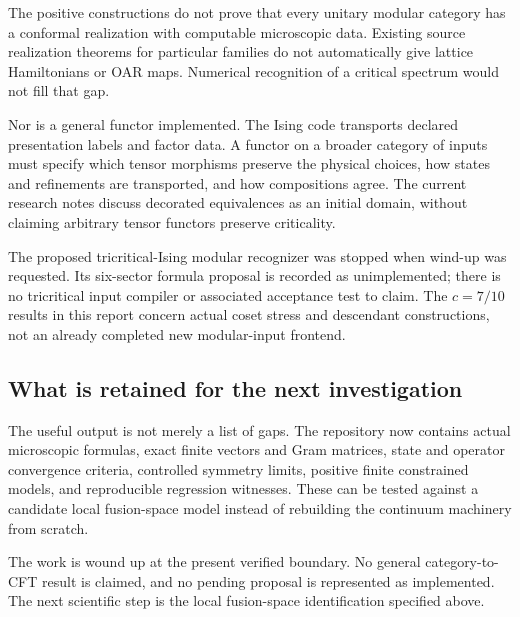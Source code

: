 The positive constructions do not prove that every unitary modular category
has a conformal realization with computable microscopic data. Existing
source realization theorems for particular families do not automatically
give lattice Hamiltonians or OAR maps. Numerical recognition of a critical
spectrum would not fill that gap.

Nor is a general functor implemented. The Ising code transports declared
presentation labels and factor data. A functor on a broader category of
inputs must specify which tensor morphisms preserve the physical choices,
how states and refinements are transported, and how compositions agree.
The current research notes discuss decorated equivalences as an initial
domain, without claiming arbitrary tensor functors preserve criticality.

The proposed tricritical-Ising modular recognizer was stopped when wind-up
was requested. Its six-sector formula proposal is recorded as unimplemented;
there is no tricritical input compiler or associated acceptance test to claim.
The $c=7/10$ results in this report concern actual coset stress and descendant
constructions, not an already completed new modular-input frontend.

\subsection{What is retained for the next investigation}

The useful output is not merely a list of gaps. The repository now contains
actual microscopic formulas, exact finite vectors and Gram matrices, state
and operator convergence criteria, controlled symmetry limits, positive
finite constrained models, and reproducible regression witnesses. These
can be tested against a candidate local fusion-space model instead of
rebuilding the continuum machinery from scratch.

The work is wound up at the present verified boundary. No general
category-to-CFT result is claimed, and no pending proposal is represented
as implemented. The next scientific step is the local fusion-space
identification specified above.
